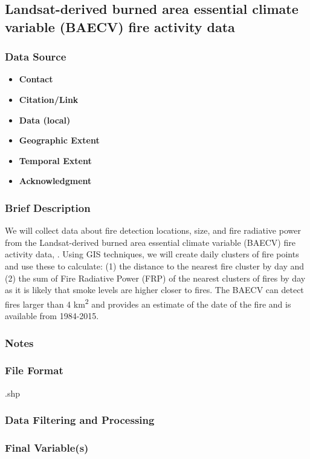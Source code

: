 \subsection{Landsat-derived burned area essential climate variable (BAECV) fire activity data}
\subsubsection*{Data Source}
\begin{itemize}[nolistsep]
\item \textbf{Contact}
\item \textbf{Citation/Link}
\item \textbf{Data (local)}
\item \textbf{Geographic Extent}
\item \textbf{Temporal Extent}
\item \textbf{Acknowledgment}
\end{itemize}
\subsubsection*{Brief Description}

We will collect data about fire detection locations, size, and fire radiative power from the Landsat-derived burned area essential climate variable (BAECV) fire activity data, 
\citep{MODISBurnArea}. 
Using GIS techniques, we will create daily clusters of fire points and use these to calculate: (1) the distance to the nearest fire cluster by day and (2) the sum of Fire Radiative Power (FRP) of the nearest clusters of fires by day as it is likely that smoke levels are higher closer to fires.  The BAECV can detect fires larger than 4 km\textsuperscript{2} and provides an estimate of the date of the fire and is available from 1984-2015. 

\subsubsection*{Notes}
\subsubsection*{File Format} .shp
\subsubsection*{Data Filtering and Processing}
\subsubsection*{Final Variable(s)}
